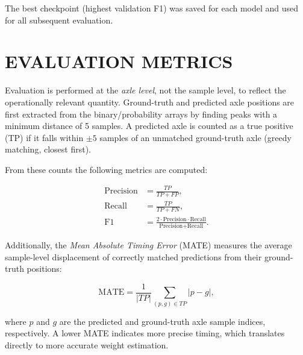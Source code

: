 The best checkpoint (highest validation F1) was saved for each model and used
for all subsequent evaluation.

\section{EVALUATION METRICS}

Evaluation is performed at the \emph{axle level}, not the sample level, to
reflect the operationally relevant quantity. Ground-truth and predicted axle
positions are first extracted from the binary/probability arrays by finding peaks
with a minimum distance of 5 samples. A predicted axle is counted as a true
positive (TP) if it falls within $\pm 5$ samples of an unmatched ground-truth
axle (greedy matching, closest first).

From these counts the following metrics are computed:

\begin{align}
    \text{Precision} &= \frac{TP}{TP + FP}, \\
    \text{Recall}    &= \frac{TP}{TP + FN}, \\
    \text{F1}        &= \frac{2 \cdot \text{Precision} \cdot \text{Recall}}
                             {\text{Precision} + \text{Recall}}.
\end{align}

Additionally, the \emph{Mean Absolute Timing Error} (MATE) measures the average
sample-level displacement of correctly matched predictions from their
ground-truth positions:

\begin{equation}
    \text{MATE} = \frac{1}{|TP|} \sum_{(p,g) \in TP} |p - g|,
\end{equation}

where $p$ and $g$ are the predicted and ground-truth axle sample indices,
respectively. A lower MATE indicates more precise timing, which translates
directly to more accurate weight estimation.